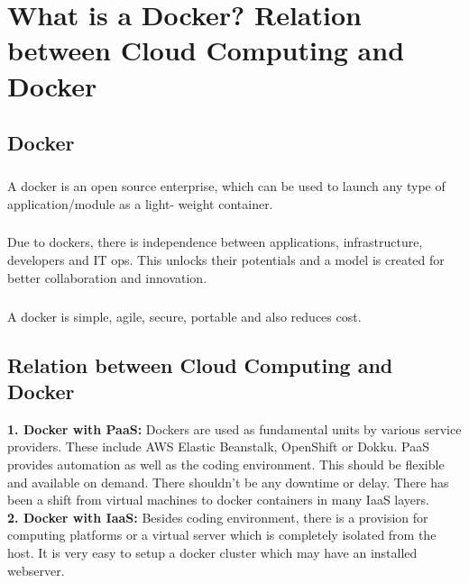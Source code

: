\chapter{What is a Docker? Relation between Cloud Computing and Docker}

\section{Docker}

\paragraph{\hspace{24pt}}
A docker is an open source enterprise, which can be used to launch any type of application/module as a light- weight container.

\paragraph{\hspace{24pt}}
Due to dockers, there is independence between applications, infrastructure, developers and IT ops. This unlocks their potentials and a model is created for better collaboration and innovation.

\paragraph{\hspace{24pt}}
A docker is simple, agile, secure, portable and also reduces cost.

\section{Relation between Cloud Computing and Docker}

\textbf{1. Docker with PaaS:} {Dockers are used as fundamental units by various service providers. These include AWS Elastic Beanstalk, OpenShift or Dokku. PaaS provides automation as well as the coding environment. This should be flexible and available on demand. There shouldn’t be any downtime or delay. There has been a shift from virtual machines to docker containers in many IaaS layers.}\\

\textbf{2. Docker with IaaS:} {Besides coding environment, there is a provision for computing platforms or a virtual server which is completely isolated from the host. It is very easy to setup a docker cluster which may have an installed webserver.}\\
